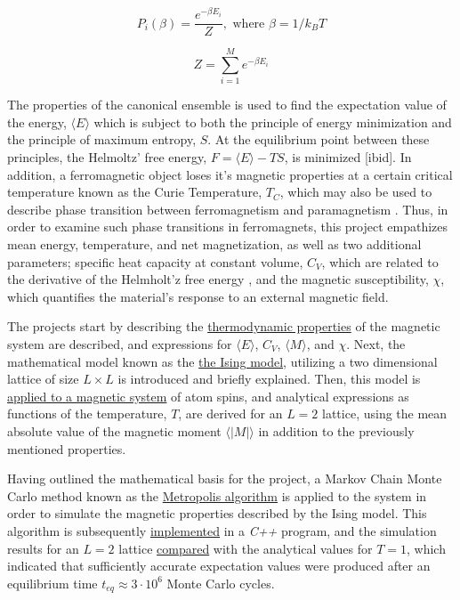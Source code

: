 \documentclass[%
oneside,                 %
final,                   %
10pt]{article}
\begin{document}
\begin{equation}
P_i(\beta)=\frac{e^{-\beta E_i}}{Z}, \text{ where }\beta=1/k_BT 
\label{eq:Boltzdist}
\end{equation}

\begin{equation}
Z=\sum_{i=1}^M e^{-\beta E_i}
\label{eq:partitionfunction}
\end{equation}

The properties of the canonical ensemble is used to find the expectation value of the energy, $\langle E \rangle$ which is subject to both the principle of energy minimization and the principle of maximum entropy, $S$. At the equilibrium point between these principles, the Helmoltz' free energy, $F=\langle E \rangle-TS$, is minimized [ibid]. In addition, a ferromagnetic object loses it's magnetic properties at a certain critical temperature known as the Curie Temperature, $T_C$, which may also be used to describe phase transition between ferromagnetism and paramagnetism \cite{FeynmanFM}. Thus, in order to examine such phase transitions in ferromagnets, this project empathizes mean energy, temperature, and net magnetization, as well as two additional parameters; specific heat capacity at constant volume, $C_V$, which are related to the derivative of the Helmholt'z free energy \cite{HJ-SP}, and the magnetic susceptibility, $\chi$, which quantifies the material's response to an external magnetic field. \newline

The projects start by describing the \hyperref[SS:thermodynamic.properties]{thermodynamic properties} of the magnetic system are described, and expressions for $\langle E \rangle$, $C_V$, $\langle M \rangle$, and $\chi$. Next, the mathematical model known as the \hyperref[SS:Ising]{the Ising model}, utilizing a two dimensional lattice of size $L \times L$ is introduced and briefly explained. Then, this model is \hyperref[SS:M.Model_application]{applied to a magnetic system} of atom spins, and analytical expressions as functions of the temperature, $T$, are derived for an $L=2$ lattice, using the mean absolute value of the magnetic moment  $\langle |M| \rangle$ in addition to the previously mentioned properties.  \newline

Having outlined the mathematical basis for the project, a Markov Chain Monte Carlo method known as the \hyperref[SS:MCMCmethod]{Metropolis algorithm} is  applied to the system in order to simulate the magnetic properties described by the Ising model. This algorithm is subsequently \hyperref[SS:init.algo.impl]{implemented} in a \textit{C++} program, and the simulation results for an $L=2$ lattice \hyperref[SS:R.initialeval]{compared} with the analytical values for $T=1$, which indicated that sufficiently accurate expectation values were produced after an equilibrium time $t_{eq} \approx 3 \cdot 10^6$ Monte Carlo cycles. \newline
\end{document}
